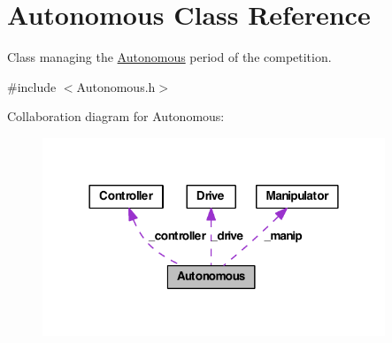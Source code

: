 \hypertarget{class_r_j_f_r_c2011_1_1_autonomous}{
\section{Autonomous Class Reference}
\label{class_r_j_f_r_c2011_1_1_autonomous}
}


Class managing the \hyperlink{class_r_j_f_r_c2011_1_1_autonomous}{Autonomous} period of the competition.  




{\ttfamily \#include $<$Autonomous.h$>$}



Collaboration diagram for Autonomous:
\nopagebreak
\begin{figure}[H]
\begin{center}
\leavevmode
\includegraphics[width=290pt]{class_r_j_f_r_c2011_1_1_autonomous__coll__graph}
\end{center}
\end{figure}
